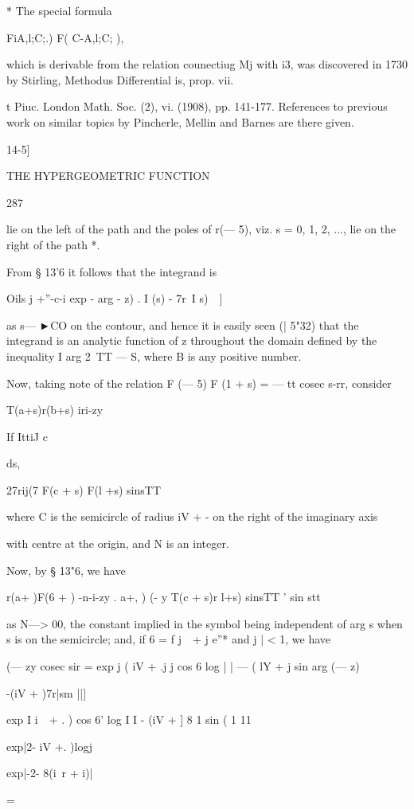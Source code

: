 * The special formula

FiA,l;C;.) F( C-A,l;C; ),

which is derivable from the relation counectiug Mj with i3, was
discovered in 1730 by Stirling, Methodus Differential is, prop. vii.

t Piuc. London Math. Soc. (2), vi. (1908), pp. 141-177. References to
previous work on similar topics by Pincherle, Mellin and Barnes are
there given.

14-5]

THE HYPERGEOMETRIC FUNCTION

287

lie on the left of the path and the poles of r(— 5), viz. s = 0, 1, 2,
..., lie on the right of the path *.

From § 13'6 it follows that the integrand is

Oils j +''-c-i exp - arg - z) . I (s) - 7r\ I s)\ \ ]

as s— ►CO on the contour, and hence it is easily seen (| 5"32) that
the integrand is an analytic function of z throughout the domain
defined by the inequality I arg 2\ TT — S, where B is any positive
number.

Now, taking note of the relation F (— 5) F (1 + s) = — tt cosec s-rr,
consider

T(a+s)r(b+s) iri-zy

If IttiJ c

ds,

27rij(7 F(c + s) F(l +s) sinsTT

where C is the semicircle of radius iV + - on the right of the
imaginary axis

with centre at the origin, and N is an integer.

Now, by § 13"6, we have

r(a+ )F(6 + ) -n-i-zy . a+,\,\,) (- y T(c + s)r l+s) sinsTT ' sin
stt

as N—> 00, the constant implied in the symbol being independent of
arg s when s is on the semicircle; and, if 6 = f j\ \ + j e''* and j
| < 1, we have

(— zy cosec sir = exp j ( iV + .j j cos 6 log | | — ( lY + j sin arg
(— z)

-(iV + )7r|sm ||]

exp I i\ \ + . ) cos 6' log I I - (iV + ] 8 1 sin ( 1 11

exp|2- iV +. )logj

exp|-2- 8(i\ r + i)|

=

